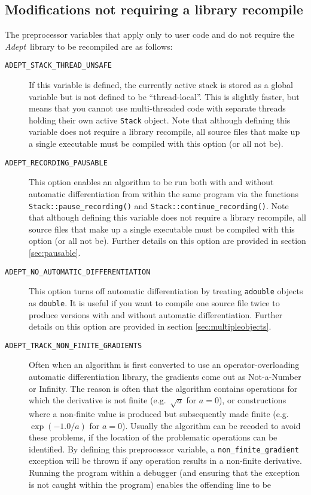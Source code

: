 \documentclass[a4,oneside]{book}
\def\codesize{\small}
\def\Adept{\emph{Adept}}
\def\code#1{{\codesize\texttt{#1}}}
\def\citem#1{\item[{\codesize\texttt{#1}}]}
\begin{document}
\subsection{Modifications not requiring a library recompile}
\label{sec:configuring_no_lib}
The preprocessor variables that apply only to user code and do not
require the \Adept\ library to be recompiled are as follows:
\begin{description}
\citem{ADEPT\_STACK\_THREAD\_UNSAFE} If this variable is defined, the
currently active stack is stored as a global variable but is not
defined to be ``thread-local''. This is slightly faster, but means
that you cannot use multi-threaded code with separate threads holding
their own active \code{Stack} object. Note that although defining this
variable does not require a library recompile, all source files that
make up a single executable must be compiled with this option (or all
not be).
%
\citem{ADEPT\_RECORDING\_PAUSABLE} This option enables an algorithm to
be run both with and without automatic differentiation from within the
same program via the functions \code{Stack::pause\_recording()} and
\code{Stack::continue\_recording()}.  Note that although defining this
variable does not require a library recompile, all source files that
make up a single executable must be compiled with this option (or all
not be). Further details on this option are provided in section
\ref{sec:pausable}.
%
\citem{ADEPT\_NO\_AUTOMATIC\_DIFFERENTIATION} This option turns off
automatic differentiation by treating \code{adouble} objects as
\code{double}. It is useful if you want to compile one source file
twice to produce versions with and without automatic
differentiation. Further details on this option are provided in
section \ref{sec:multipleobjects}.
%
\citem{ADEPT\_TRACK\_NON\_FINITE\_GRADIENTS} Often when an algorithm
is first converted to use an operator-overloading automatic
differentiation library, the gradients come out as Not-a-Number or
Infinity. The reason is often that the algorithm contains operations
for which the derivative is not finite (e.g.\ $\sqrt{a}$ for $a=0$),
or constructions where a non-finite value is produced but subsequently
made finite (e.g.\ $\exp(-1.0/a)$ for $a=0$). Usually the algorithm
can be recoded to avoid these problems, if the location of the
problematic operations can be identified. By defining this
preprocessor variable, a \code{non\_finite\_gradient} exception will
be thrown if any operation results in a non-finite derivative. Running
the program within a debugger (and ensuring that the exception is not
caught within the program) enables the offending line to be

\end{description}
\end{document}
